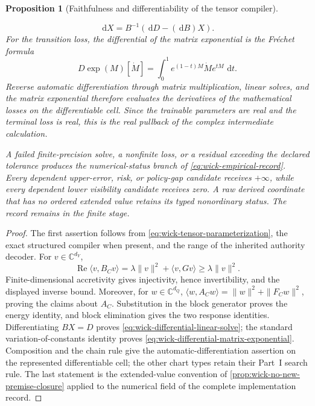 \documentclass[11pt]{article}
\numberwithin{section}{part}
\theoremstyle{plain}
\newtheorem{proposition}[proposition]{Proposition}
\theoremstyle{definition}
\theoremstyle{remark}
\newcommand{\dd}{\,\mathrm d}
\begin{document}
\begin{proposition}[Faithfulness and differentiability of the tensor compiler]
\begin{enumerate}[label=\textup{(\roman*)}]
      \begin{equation}
       \label{eq:wick-differential-linear-solve}
       \dd X=B^{-1}(\dd D-(\dd B)X).
      \end{equation}
      For the transition loss, the differential of the matrix exponential is
      the Fr\'echet formula
      \begin{equation}
       \label{eq:wick-differential-matrix-exponential}
       D\exp(M)[\dot M]
       =\int_0^1e^{(1-t)M}\dot M e^{tM}\,\dd t.
      \end{equation}
      Reverse automatic differentiation through matrix multiplication,
      linear solves, and the matrix exponential therefore evaluates the
      derivatives of the mathematical losses on the differentiable cell.
      Since the trainable parameters are real and the terminal loss is real,
      this is the real pullback of the complex intermediate calculation.
\end{enumerate}
A failed finite-precision solve, a nonfinite loss, or a residual exceeding the
declared tolerance produces the numerical-status branch of
\eqref{eq:wick-empirical-record}.  Every dependent upper-error, risk, or
policy-gap candidate receives \(+\infty\), while every dependent lower
visibility candidate receives zero.  A raw derived coordinate that has no
ordered extended value retains its typed nonordinary status.  The record
remains in the finite stage.
\end{proposition}

\begin{proof}
The first assertion follows from
\eqref{eq:wick-tensor-parameterization}, the exact structured compiler when
present, and the range of the inherited authority decoder.  For
\(v\in\mathbb C^{d_Y}\),
\[
 \operatorname{Re}\langle v,B_Cv\rangle
 =\lambda\|v\|^2+\langle v,Gv\rangle\ge\lambda\|v\|^2.
\]
Finite-dimensional accretivity gives injectivity, hence invertibility, and
the displayed inverse bound.  Moreover, for \(w\in\mathbb C^{d_Q}\),
\(\langle w,A_Cw\rangle=\|w\|^2+\|F_Cw\|^2\), proving the claims about
\(A_C\).  Substitution in the block generator proves the energy identity,
and block elimination gives the two response identities.  Differentiating
\(BX=D\) proves \eqref{eq:wick-differential-linear-solve}; the standard
variation-of-constants identity proves
\eqref{eq:wick-differential-matrix-exponential}.  Composition and the chain
rule give the automatic-differentiation assertion on the represented
differentiable cell; the other chart types retain their Part~I search rule.
The last statement is
the extended-value convention of
\cref{prop:wick-no-new-premise-closure} applied to the numerical field of the
complete implementation record.
\end{proof}
\end{document}
